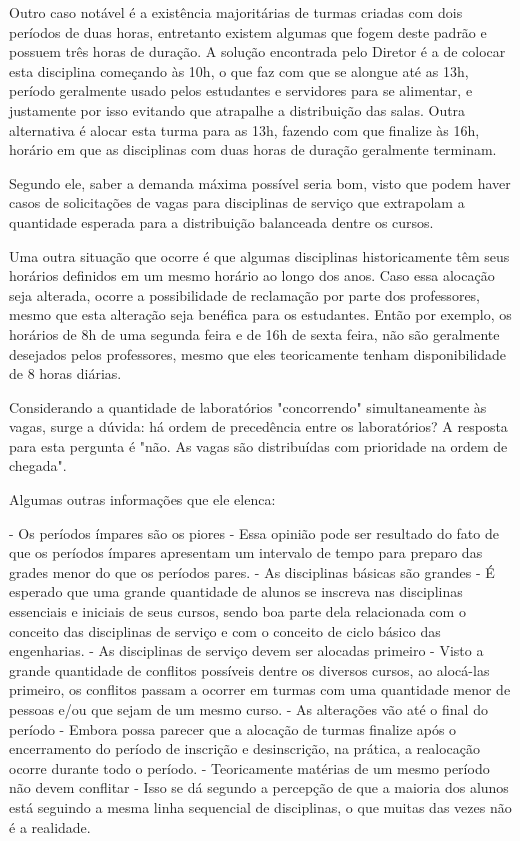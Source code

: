         Outro caso notável é a existência majoritárias de turmas criadas com dois períodos de duas horas, entretanto existem algumas que fogem deste padrão e possuem três horas de duração. A solução encontrada pelo Diretor é a de colocar esta disciplina começando às 10h, o que faz com que se alongue até as 13h, período geralmente usado pelos estudantes e servidores para se alimentar, e justamente por isso evitando que atrapalhe a distribuição das salas. Outra alternativa é alocar esta turma para as 13h, fazendo com que finalize às 16h, horário em que as disciplinas com duas horas de duração geralmente terminam.

        Segundo ele, saber a demanda máxima possível seria bom, visto que podem haver casos de solicitações de vagas para disciplinas de serviço que extrapolam a quantidade esperada para a distribuição balanceada dentre os cursos.

        Uma outra situação que ocorre é que algumas disciplinas historicamente têm seus horários definidos em um mesmo horário ao longo dos anos. Caso essa alocação seja alterada, ocorre a possibilidade de reclamação por parte dos professores, mesmo que esta alteração seja benéfica para os estudantes. Então por exemplo, os horários de 8h de uma segunda feira e de 16h de sexta feira, não são geralmente desejados pelos professores, mesmo que eles teoricamente tenham disponibilidade de 8 horas diárias.

        Considerando a quantidade de laboratórios "concorrendo" simultaneamente às vagas, surge a dúvida: há ordem de precedência entre os laboratórios? A resposta para esta pergunta é "não. As vagas são distribuídas com prioridade na ordem de chegada".

        Algumas outras informações que ele elenca:

        - Os períodos ímpares são os piores
        - Essa opinião pode ser resultado do fato de que os períodos ímpares apresentam um intervalo de tempo para preparo das grades menor do que os períodos pares.
        - As disciplinas básicas são grandes
        - É esperado que uma grande quantidade de alunos se inscreva nas disciplinas essenciais e iniciais de seus cursos, sendo boa parte dela relacionada com o conceito das disciplinas de serviço e com o conceito de ciclo básico das engenharias.
        - As disciplinas de serviço devem ser alocadas primeiro
        - Visto a grande quantidade de conflitos possíveis dentre os diversos cursos, ao alocá-las primeiro, os conflitos passam a ocorrer em turmas com uma quantidade menor de pessoas e/ou que sejam de um mesmo curso.
        - As alterações vão até o final do período
        - Embora possa parecer que a alocação de turmas finalize após o encerramento do período de inscrição e desinscrição, na prática, a realocação ocorre durante todo o período.
        - Teoricamente matérias de um mesmo período não devem conflitar
        - Isso se dá segundo a percepção de que a maioria dos alunos está seguindo a mesma linha sequencial de disciplinas, o que muitas das vezes não é a realidade.

